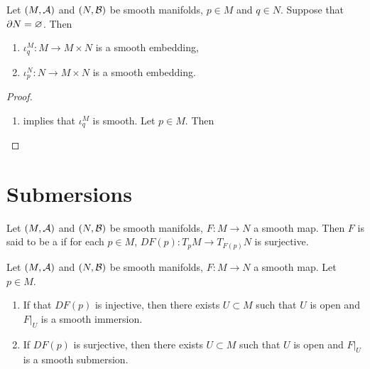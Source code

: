 \documentclass{book}
\begin{document}
	\begin{ex} 
		Let $(M, \mathcal{A})$ and $(N, \mathcal{B})$ be smooth manifolds, $p \in M$ and $q \in N$. Suppose that $\partial N = \varnothing$. Then 
		\begin{enumerate}
			\item $\iota^M_q: M \rightarrow M \times N$ is a smooth embedding,
			\item $\iota^N_p: N \rightarrow M \times N$ is a smooth embedding.
		\end{enumerate}
	\end{ex}

	\begin{proof}\
		\begin{enumerate}
			\item {} implies that $\iota_q^M$ is smooth. Let $p \in M$. Then 
		\end{enumerate}
	\end{proof}
































	\newpage
	\section{Submersions}
	
	
	\begin{defn} 
		Let $(M, \mathcal{A})$ and $(N, \mathcal{B})$ be smooth manifolds, $F: M \rightarrow N$ a smooth map. Then $F$ is said to be a  if for each $p \in M$, $DF(p) :T_pM\rightarrow T_{F(p)}N$ is surjective.
	\end{defn}

	\begin{ex} 
		Let $(M, \mathcal{A})$ and $(N, \mathcal{B})$ be smooth manifolds, $F: M \rightarrow N$ a smooth map. Let $p \in M$.
		\begin{enumerate}
			\item If that $DF(p)$ is injective, then there exists $U \subset M$ such that $U$ is open and $F|_U$ is a smooth immersion.
			\item If $DF(p)$ is surjective, then there exists $U \subset M$ such that $U$ is open and $F|_U$ is a smooth submersion.
		\end{enumerate}
	\end{ex}
\end{document}

